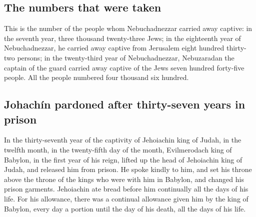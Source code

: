 \hypertarget{the-numbers-that-were-taken}{%
\subsection{The numbers that were
taken}\label{the-numbers-that-were-taken}}

 This is the number of the people whom Nebuchadnezzar
carried away captive: in the seventh year, three thousand twenty-three
Jews;  in the eighteenth year of Nebuchadnezzar, he
carried away captive from Jerusalem eight hundred thirty-two persons;
 in the twenty-third year of Nebuchadnezzar, Nebuzaradan
the captain of the guard carried away captive of the Jews seven hundred
forty-five people. All the people numbered four thousand six hundred.

\hypertarget{johachuxedn-pardoned-after-thirty-seven-years-in-prison}{%
\subsection{Johachín pardoned after thirty-seven years in
prison}\label{johachuxedn-pardoned-after-thirty-seven-years-in-prison}}

 In the thirty-seventh year of the captivity of
Jehoiachin king of Judah, in the twelfth month, in the twenty-fifth day
of the month, Evilmerodach king of Babylon, in the first year of his
reign, lifted up the head of Jehoiachin king of Judah, and released him
from prison.  He spoke kindly to him, and set his throne
above the throne of the kings who were with him in Babylon,
 and changed his prison garments. Jehoiachin ate bread
before him continually all the days of his life.  For his
allowance, there was a continual allowance given him by the king of
Babylon, every day a portion until the day of his death, all the days of
his life.

